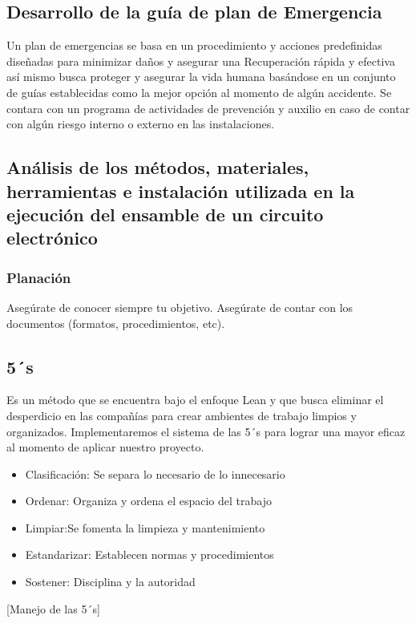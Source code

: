     \subsection{Desarrollo de la guía de plan de Emergencia}
    
    Un plan de emergencias se basa en un procedimiento y acciones predefinidas diseñadas para minimizar daños y asegurar una Recuperación rápida y efectiva así mismo busca proteger y asegurar la vida humana basándose en un conjunto de guías establecidas como la mejor opción al momento de algún accidente. Se contara con un  programa de actividades de prevención y auxilio en caso de contar con algún riesgo interno o externo en las instalaciones.  
    \subsection{Análisis de los métodos, materiales, herramientas e instalación utilizada en la ejecución del ensamble de un circuito electrónico}
    \subsubsection{Planación}
    
    Asegúrate de conocer siempre tu objetivo.
    Asegúrate de contar con los documentos (formatos, procedimientos, etc).
    \subsection{5´s}
    Es un método que se encuentra  bajo el enfoque Lean y que busca eliminar el desperdicio en las compañías para crear ambientes de trabajo limpios y organizados.
    Implementaremos el sistema de las 5´s para lograr una mayor eficaz al momento de aplicar nuestro proyecto.\cite{MF}
    \begin{itemize}
        \item Clasificación: Se separa lo necesario de lo innecesario
        \item Ordenar: Organiza y ordena el espacio del trabajo
        \item Limpiar:Se fomenta la limpieza y mantenimiento
        \item Estandarizar: Establecen normas y procedimientos
        \item Sostener: Disciplina y la autoridad
        
    \end{itemize}[Manejo de las 5´s]
